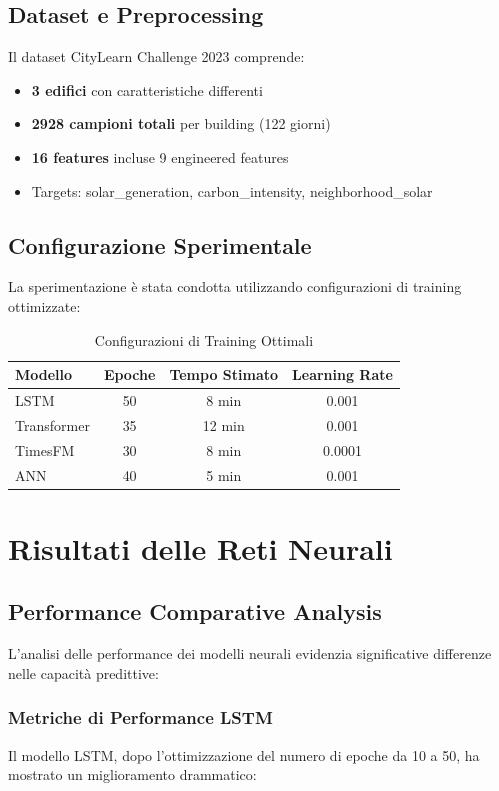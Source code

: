 \documentclass[11pt,a4paper]{article}
\begin{document}
\subsection{Dataset e Preprocessing}
Il dataset CityLearn Challenge 2023 comprende:
\begin{itemize}
    \item \textbf{3 edifici} con caratteristiche differenti
    \item \textbf{2928 campioni totali} per building (122 giorni)
    \item \textbf{16 features} incluse 9 engineered features
    \item Targets: solar\_generation, carbon\_intensity, neighborhood\_solar
\end{itemize}

\subsection{Configurazione Sperimentale}
La sperimentazione è stata condotta utilizzando configurazioni di training ottimizzate:

\begin{table}[H]
\centering
\caption{Configurazioni di Training Ottimali}
\begin{tabular}{@{}lccc@{}}
\toprule
\textbf{Modello} & \textbf{Epoche} & \textbf{Tempo Stimato} & \textbf{Learning Rate} \\
\midrule
LSTM & 50 & 8 min & 0.001 \\
Transformer & 35 & 12 min & 0.001 \\
TimesFM & 30 & 8 min & 0.0001 \\
ANN & 40 & 5 min & 0.001 \\
\bottomrule
\end{tabular}
\end{table}

\section{Risultati delle Reti Neurali}

\subsection{Performance Comparative Analysis}

L'analisi delle performance dei modelli neurali evidenzia significative differenze nelle capacità predittive:

\subsubsection{Metriche di Performance LSTM}
Il modello LSTM, dopo l'ottimizzazione del numero di epoche da 10 a 50, ha mostrato un miglioramento drammatico:
\end{document}
